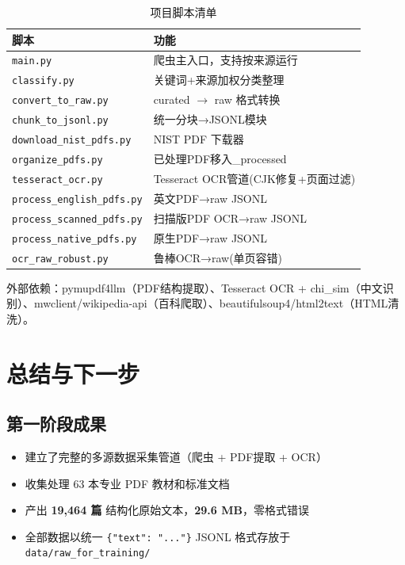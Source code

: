 \documentclass[12pt,a4paper]{ctexart}
\begin{document}
\begin{table}[htbp]
\centering
\caption{项目脚本清单}
\label{tab:scripts}
\small
\begin{tabular}{@{}ll@{}}
\toprule
\textbf{脚本} & \textbf{功能} \\
\midrule
\texttt{main.py}                 & 爬虫主入口，支持按来源运行 \\
\texttt{classify.py}             & 关键词+来源加权分类整理 \\
\texttt{convert\_to\_raw.py}     & curated $\to$ raw 格式转换 \\
\texttt{chunk\_to\_jsonl.py}     & 统一分块→JSONL模块 \\
\texttt{download\_nist\_pdfs.py} & NIST PDF 下载器 \\
\texttt{organize\_pdfs.py}       & 已处理PDF移入\_processed \\
\texttt{tesseract\_ocr.py}       & Tesseract OCR管道(CJK修复+页面过滤) \\
\texttt{process\_english\_pdfs.py} & 英文PDF→raw JSONL \\
\texttt{process\_scanned\_pdfs.py} & 扫描版PDF OCR→raw JSONL \\
\texttt{process\_native\_pdfs.py}  & 原生PDF→raw JSONL \\
\texttt{ocr\_raw\_robust.py}       & 鲁棒OCR→raw(单页容错) \\
\bottomrule
\end{tabular}
\end{table}

外部依赖：pymupdf4llm（PDF结构提取）、Tesseract OCR + chi\_sim（中文识别）、mwclient/wikipedia-api（百科爬取）、beautifulsoup4/html2text（HTML清洗）。

\section{总结与下一步}

\subsection{第一阶段成果}

\begin{itemize}
    \item 建立了完整的多源数据采集管道（爬虫 + PDF提取 + OCR）
    \item 收集处理 63 本专业 PDF 教材和标准文档
    \item 产出 \textbf{19,464 篇} 结构化原始文本，\textbf{29.6 MB}，零格式错误
    \item 全部数据以统一 \texttt{\{"text": "..."\}} JSONL 格式存放于 \texttt{data/raw\_for\_training/}
\end{itemize}
\end{document}

